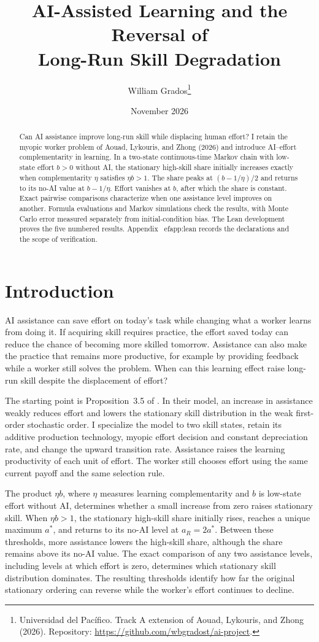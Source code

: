 \documentclass[11pt]{article}
\title{AI-Assisted Learning and the Reversal of\\Long-Run Skill Degradation}
\author{William Grados\thanks{Universidad del Pac\'ifico. Track A extension of
 Aouad, Lykouris, and Zhong (2026). Repository:
 \url{https://github.com/wbgradost/ai-project}.}}
\date{November 2026}
\theoremstyle{definition}
\begin{document}
\maketitle
\begin{abstract}
\noindent Can AI assistance improve long-run skill while displacing human
effort? I retain the myopic worker problem of Aouad, Lykouris, and Zhong
(2026) and introduce AI--effort complementarity in learning. In a two-state
continuous-time Markov chain with low-state effort $b>0$ without AI, the
stationary high-skill share initially increases exactly when complementarity
$\eta$ satisfies $\eta b>1$. The share peaks at $(b-1/\eta)/2$ and returns to
its no-AI value at $b-1/\eta$. Effort vanishes at $b$, after which the share
is constant. Exact pairwise comparisons characterize when one assistance
level improves on another. Formula evaluations and Markov simulations check
the results, with Monte Carlo error measured separately from
initial-condition bias. The Lean development proves the five numbered results. Appendix~
ef{app:lean}
records the declarations and the scope of verification.
\end{abstract}

\section{Introduction}
AI assistance can save effort on today's task while changing what a worker
learns from doing it. If acquiring skill requires practice, the effort saved
today can reduce the chance of becoming more skilled tomorrow. Assistance
can also make the practice that remains more productive, for example by
providing feedback while a worker still solves the problem. When can this
learning effect raise long-run skill despite the displacement of effort?

The starting point is Proposition~3.5 of \citet[p.~8]{aouad2026paradoxes}.
In their model, an increase in assistance weakly reduces effort and lowers
the stationary skill distribution in the weak first-order stochastic
order. I specialize the model to two skill states, retain its additive
production technology, myopic effort decision and constant depreciation
rate, and change the upward transition rate. Assistance raises the
learning productivity of each unit of effort. The worker still chooses
effort using the same current payoff and the same selection rule.

The product $\eta b$, where $\eta$ measures learning complementarity and
$b$ is low-state effort without AI, determines whether a small increase
from zero raises stationary skill. When $\eta b>1$, the stationary
high-skill share initially rises, reaches a unique maximum $a^*$, and
returns to its no-AI level at $a_R=2a^*$. Between these thresholds, more
assistance lowers the high-skill share, although the share remains above
its no-AI value. The exact comparison of any two assistance levels,
including levels at which effort is zero, determines which stationary
skill distribution dominates. The resulting thresholds identify how far
the original stationary ordering can reverse while the worker's effort
continues to decline.
\end{document}
